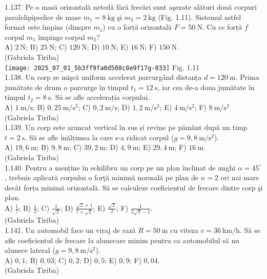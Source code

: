 1.137. Pe o masă orizontală netedã fără frecări sunt aşezate alături două corpuri paralelipipedice de mase $m_{1}=8 \mathrm{~kg}$ şi $m_{2}=2 \mathrm{~kg}$ (Fig. 1.11). Sistemul astfel format este împins (dinspre $m_{1}$) cu o forță orizontală $F=50 \mathrm{~N}$. Cu ce forță $f$ corpul $m_{1}$ împinge corpul $m_{2}$?\\ A) $2 \mathrm{~N}$; B) $25 \mathrm{~N}$; C) $120 \mathrm{~N}$; D) $10 \mathrm{~N}$; E) $16 \mathrm{~N}$; F) $150 \mathrm{~N}$.\\ (Gabriela Tiriba)\\ \texttt{[image: 2025\_07\_01\_5b3ff9fa0d508c8e9f17g-033]} Fig. 1.11\\

1.138. Un corp se mişcă uniform accelerat parcurgând distanța $d=120 \mathrm{~m}$. Prima jumătate de drum o parcurge în timpul $t_{1}=12 \mathrm{~s}$, iar cea de-a doua jumătate în timpul $t_{2}=8 \mathrm{~s}$. Să se afle accelerația corpului.\\ A) $1 \mathrm{~m} / \mathrm{s}$; B) $0,25 \mathrm{~m} / \mathrm{s}^{2}$; C) $0,2 \mathrm{~m} / \mathrm{s}$; D) $1,2 \mathrm{~m} / \mathrm{s}^{2}$; E) $4 \mathrm{~m} / \mathrm{s}^{2}$; F) $8 \mathrm{~m} / \mathrm{s}^{2}$\\ (Gabriela Tiriba)\\

1.139. Un corp este aruncat vertical în sus și revine pe pământ după un timp $t=2 \mathrm{~s}$. Sã se afle înălțimea la care s-a ridicat corpul ($g=9,8 \mathrm{~m} / \mathrm{s}^{2}$).\\ A) $19,6 \mathrm{~m}$; B) $9,8 \mathrm{~m}$; C) $39,2 \mathrm{~m}$; D) $4,9 \mathrm{~m}$; E) $29,4 \mathrm{~m}$; F) $16 \mathrm{~m}$.\\ (Gabriela Tiriba)\\

1.140. Pentru a menține în echilibru un corp pe un plan înclinat de unghi $\alpha=45^{\circ}$, trebuie aplicată corpului o forţă minimă normală pe plan de $n=2$ ori nai mare decât forța minimă orizontală. Să se calculeze coeficientul de frecare dintre corp şi plan.\\ A) $\frac{1}{7}$; B) $\frac{1}{2}$; C) $\frac{1}{\sqrt{2}}$; D) $\frac{\sqrt{2}+1}{7+\sqrt{2}}$; E) $\frac{\sqrt{3}}{2}$; F) $\frac{1}{2 \sqrt{2}-1}$. \\ (Gabriela Tiriba)\\

1.141. Un automobil face un viraj de rază $R=50 \mathrm{~m}$ cu viteza $v=36 \mathrm{~km} / \mathrm{h}$. Sã se afle coeficientul de frecare la alunecare minim pentru ca automobilul să nu alunece lateral ($g=9,8 \mathrm{~m} / \mathrm{s}^{2}$).\\ A) $0,1$; B) $0,03$; C) $0,2$; D) $0,5$; E) $0,9$; F) $0,04$.\\ (Gabriela Tiriba)\\


